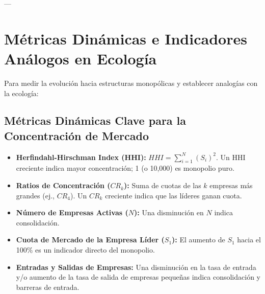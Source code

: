 \documentclass{article}
\begin{document}
---

\section{Métricas Dinámicas e Indicadores Análogos en Ecología}

Para medir la evolución hacia estructuras monopólicas y establecer analogías con la ecología:

\subsection{Métricas Dinámicas Clave para la Concentración de Mercado}
\begin{itemize}
    \item \textbf{Herfindahl-Hirschman Index (HHI):} $HHI = \sum_{i=1}^{N} (S_i)^2$. Un HHI creciente indica mayor concentración; 1 (o 10,000) es monopolio puro.
    \item \textbf{Ratios de Concentración ($CR_k$):} Suma de cuotas de las $k$ empresas más grandes (ej., $CR_4$). Un $CR_k$ creciente indica que las líderes ganan cuota.
    \item \textbf{Número de Empresas Activas ($N$):} Una disminución en $N$ indica consolidación.
    \item \textbf{Cuota de Mercado de la Empresa Líder ($S_1$):} El aumento de $S_1$ hacia el 100\% es un indicador directo del monopolio.
    \item \textbf{Entradas y Salidas de Empresas:} Una disminución en la tasa de entrada y/o aumento de la tasa de salida de empresas pequeñas indica consolidación y barreras de entrada.
\end{itemize}
\end{document}

